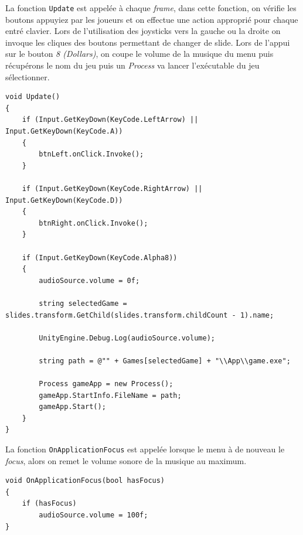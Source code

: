 \documentclass[12pt]{article}
\begin{document}
La fonction \texttt{Update} est appelée à chaque \textit{frame}, dans cette fonction, on vérifie les boutons appuyiez par les joueurs et on effectue une action approprié pour chaque entré clavier. Lors de l'utilisation des joysticks vers la gauche ou la droite on invoque les cliques des boutons permettant de changer de slide. Lors de l'appui sur le bouton \textit{8 (Dollars)}, on coupe le volume de la musique du menu puis récupérons le nom du jeu puis un \textit{Process} va lancer l'exécutable du jeu sélectionner.
\begin{lstlisting}
void Update()
{
    if (Input.GetKeyDown(KeyCode.LeftArrow) || Input.GetKeyDown(KeyCode.A))
    {
        btnLeft.onClick.Invoke();
    }

    if (Input.GetKeyDown(KeyCode.RightArrow) || Input.GetKeyDown(KeyCode.D))
    {
        btnRight.onClick.Invoke();
    }

    if (Input.GetKeyDown(KeyCode.Alpha8))
    {
        audioSource.volume = 0f;

        string selectedGame = slides.transform.GetChild(slides.transform.childCount - 1).name;

        UnityEngine.Debug.Log(audioSource.volume);

        string path = @"" + Games[selectedGame] + "\\App\\game.exe";

        Process gameApp = new Process();
        gameApp.StartInfo.FileName = path;
        gameApp.Start();
    }
}
\end{lstlisting}

La fonction \texttt{OnApplicationFocus} est appelée lorsque le menu à de nouveau le \textit{focus}, alors on remet le volume sonore de la musique au maximum.
\begin{lstlisting}
void OnApplicationFocus(bool hasFocus)
{
    if (hasFocus)
        audioSource.volume = 100f;
}
\end{lstlisting}
\end{document}
